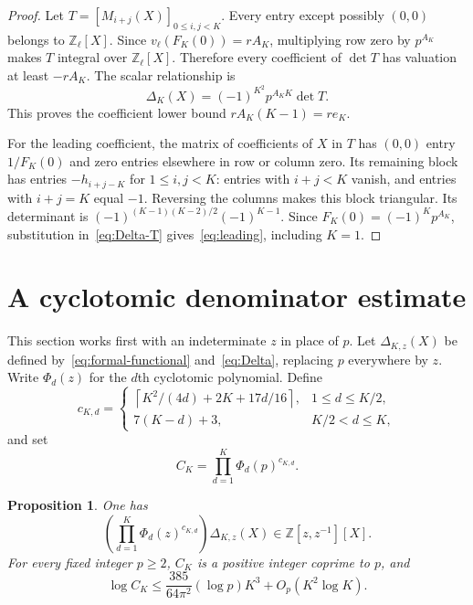 \documentclass[11pt]{article}
\newtheorem{proposition}[theorem]{Proposition}
\theoremstyle{remark}
\newcommand{\Z}{\mathbb Z}
\begin{document}
\begin{proof}
Let $T=[M_{i+j}(X)]_{0\le i,j<K}$. Every entry except possibly $(0,0)$
belongs to $\Z_\ell[X]$. Since
$v_\ell(F_K(0))=rA_K$, multiplying row zero by $p^{A_K}$ makes $T$
integral over $\Z_\ell[X]$. Therefore every coefficient of $\det T$
has valuation at least $-rA_K$. The scalar relationship is
\begin{equation}\label{eq:Delta-T}
 \Delta_K(X)=(-1)^{K^2}p^{A_KK}\det T.
\end{equation}
This proves the coefficient lower bound $rA_K(K-1)=re_K$.

For the leading coefficient, the matrix of coefficients of $X$ in $T$
has $(0,0)$ entry $1/F_K(0)$ and zero entries elsewhere in row or
column zero. Its remaining block has entries $-h_{i+j-K}$ for
$1\le i,j<K$: entries with $i+j<K$ vanish, and entries with $i+j=K$
equal $-1$. Reversing the columns makes this block triangular.
Its determinant is
$(-1)^{(K-1)(K-2)/2}(-1)^{K-1}$.
Since $F_K(0)=(-1)^Kp^{A_K}$, substitution
in~\eqref{eq:Delta-T} gives~\eqref{eq:leading}, including $K=1$.
\end{proof}

\section{A cyclotomic denominator estimate}

This section works first with an indeterminate $z$ in place of $p$.
Let $\Delta_{K,z}(X)$ be defined by~\eqref{eq:formal-functional}
and~\eqref{eq:Delta}, replacing $p$ everywhere by $z$. Write
$\Phi_d(z)$ for the $d$th cyclotomic polynomial. Define
\begin{equation}\label{eq:cd}
 c_{K,d}=\begin{cases}
 \left\lceil K^2/(4d)+2K+17d/16\right\rceil,&1\le d\le K/2,\\
 7(K-d)+3,&K/2<d\le K,
 \end{cases}
\end{equation}
and set
\begin{equation}\label{eq:CK}
 C_K=\prod_{d=1}^K\Phi_d(p)^{c_{K,d}}.
\end{equation}

\begin{proposition}\label{prop:denominators}
One has
\begin{equation}\label{eq:laurent-integral}
 \left(\prod_{d=1}^K\Phi_d(z)^{c_{K,d}}\right)\Delta_{K,z}(X)
       \in\Z[z,z^{-1}][X].
\end{equation}
For every fixed integer $p\ge2$, $C_K$ is a positive integer coprime
to $p$, and
\begin{equation}\label{eq:denom-growth}
 \log C_K\le\frac{385}{64\pi^2}(\log p)K^3
                   +O_p(K^2\log K).
\end{equation}
\end{proposition}
\end{document}
